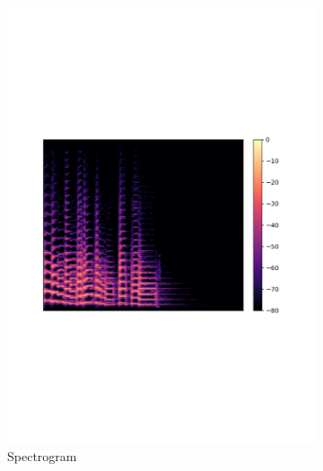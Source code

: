\begin{figure}
     \centering
     \begin{subfigure}[b]{0.48\textwidth}
         \centering
         \includegraphics[width=\textwidth]{02-fundamentals/figures/spectrogram.pdf}
         \caption{Spectrogram}
         \label{fig:spectrogram}
     \end{subfigure}
     \hfill
     \begin{subfigure}[b]{0.48\textwidth}
         \centering

\end{subfigure}
\end{figure}
